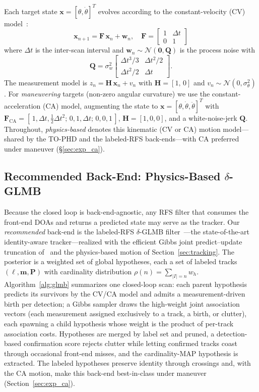 \documentclass[journal]{IEEEtran}
\newcommand{\mat}[1]{\mathbf{#1}}
\begin{document}
Each target state $\mat{x} = [\theta, \dot{\theta}]^T$ evolves according to the constant-velocity (CV) model~\cite{simon2006optimal}:
\begin{equation}
\mat{x}_{n+1} = \mat{F}\,\mat{x}_n + \mat{w}_n, \quad
\mat{F} = \begin{bmatrix} 1 & \Delta t \\ 0 & 1 \end{bmatrix}
\label{eq:motion_model}
\end{equation}
where $\Delta t$ is the inter-scan interval and $\mat{w}_n \sim \mathcal{N}(\mat{0}, \mat{Q})$ is the process noise with
\begin{equation}
\mat{Q} = \sigma_w^2 \begin{bmatrix} \Delta t^3/3 & \Delta t^2/2 \\ \Delta t^2/2 & \Delta t \end{bmatrix}.
\label{eq:process_noise}
\end{equation}
The measurement model is $z_n = \mat{H}\,\mat{x}_n + v_n$ with $\mat{H} = [1,\, 0]$ and $v_n \sim \mathcal{N}(0, \sigma_\theta^2)$. For \emph{maneuvering} targets (non-zero angular curvature) we use the constant-acceleration (CA) model, augmenting the state to $\mat{x}=[\theta,\dot{\theta},\ddot{\theta}]^T$ with $\mat{F}_{\mathrm{CA}}=[\,1,\Delta t,\tfrac12\Delta t^2;\,0,1,\Delta t;\,0,0,1\,]$, $\mat{H}=[1,0,0]$, and a white-noise-jerk $\mat{Q}$. Throughout, \emph{physics-based} denotes this kinematic (CV or CA) motion model---shared by the TO-PHD and the labeled-RFS back-ends---with CA preferred under maneuver (\S\ref{sec:exp_ca}).

\subsection{Recommended Back-End: Physics-Based $\delta$-GLMB}

Because the closed loop is back-end-agnostic, any RFS filter that consumes the front-end DOAs and returns a predicted state may serve as the tracker. Our \emph{recommended} back-end is the labeled-RFS $\delta$-GLMB filter~\cite{vo2013glmb}---the state-of-the-art identity-aware tracker---realized with the efficient Gibbs joint predict--update truncation of~\cite{vo2017efficient} and the physics-based motion of Section~\ref{sec:tracking}. The posterior is a weighted set of global hypotheses, each a set of labeled tracks $(\ell,\mat{m},\mat{P})$ with cardinality distribution $\rho(n)=\sum_{|I|=n} w_h$. Algorithm~\ref{alg:glmb} summarizes one closed-loop scan: each parent hypothesis predicts its survivors by the CV/CA model and admits a measurement-driven birth per detection; a Gibbs sampler draws the high-weight joint association vectors (each measurement assigned exclusively to a track, a birth, or clutter), each spawning a child hypothesis whose weight is the product of per-track association costs. Hypotheses are merged by label set and pruned, a detection-based confirmation score rejects clutter while letting confirmed tracks coast through occasional front-end misses, and the cardinality-MAP hypothesis is extracted. The labeled hypotheses preserve identity through crossings and, with the CA motion, make this back-end best-in-class under maneuver (Section~\ref{sec:exp_ca}).
\end{document}
